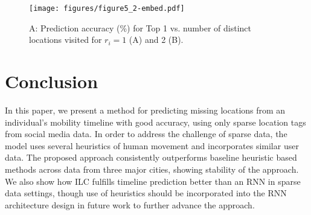 



\begin{figure}[]
\centering
\texttt{[image: figures/figure5\_2-embed.pdf]}
\caption{A: Prediction accuracy (\%) for Top 1 vs. number of distinct locations visited for $r_i =1$ (A) and 2 (B).}
\label{distinct_loc_accuracy}
\end{figure}



\section{Conclusion}
In this paper, we present a method for predicting missing locations from an individual's mobility timeline with good accuracy, using only sparse location tags from social media data. %
In order to address the challenge of sparse data, the model uses several heuristics of human movement and incorporates similar user data.
The proposed approach consistently outperforms baseline heuristic based methods across data from three major cities, showing stability of the approach. We also show how ILC fulfills timeline prediction better than an RNN in sparse data settings, though use of heuristics should be incorporated into the RNN architecture design in future work to further advance the approach.

